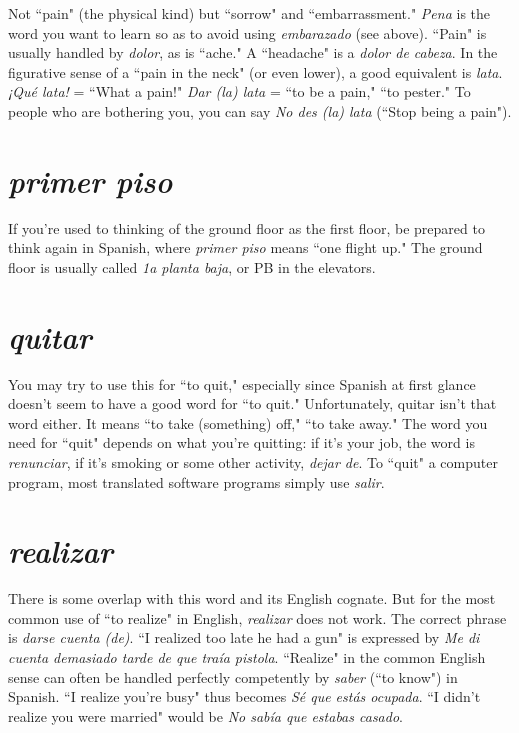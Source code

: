 Not ``pain" (the physical kind) but ``sorrow" and ``embarrassment." \emph{Pena} is the word you want to learn so as to avoid using
\emph{embarazado} (see above). ``Pain" is usually handled by \emph{dolor}, as is
``ache." A ``headache" is a \emph{dolor de cabeza}. In the figurative sense of
a ``pain in the neck" (or even lower), a good equivalent is \emph{lata}. \emph{¡Qué
lata!} = ``What a pain!" \emph{Dar (la) lata} = ``to be a pain," ``to pester." To
people who are bothering you, you can say \emph{No des (la) lata} (``Stop being a pain").

\section{\emph{primer piso}}

If you're used to thinking of the ground floor as
the first floor, be prepared to think again in Spanish, where \emph{primer piso}
means ``one flight up." The ground floor is usually called \emph{1a planta
baja}, or PB in the elevators.

\section{\emph{quitar}}

You may try to use this for ``to quit," especially
since Spanish at first glance doesn't seem to have a good word for ``to
quit." Unfortunately, quitar isn't that word either. It means ``to take
(something) off," ``to take away." The word you need for ``quit" depends on what you're quitting: if it's your job, the word is \emph{renunciar}, if
it's smoking or some other activity, \emph{dejar de}. To ``quit" a computer
program, most translated software programs simply use \emph{salir}.

\section{\emph{realizar}}

There is some overlap with this word and its English cognate. But for the most common use of ``to realize" in English,
\emph{realizar} does not work. The correct phrase is \emph{darse cuenta (de)}. ``I realized too late he had a gun" is expressed by \emph{Me di cuenta demasiado
tarde de que traía pistola}. ``Realize" in the common English sense can
often be handled perfectly competently by \emph{saber} (``to know") in Spanish. ``I realize you're busy" thus becomes \emph{Sé que estás ocupada}. ``I
didn't realize you were married" would be \emph{No sabía que estabas
casado}.

